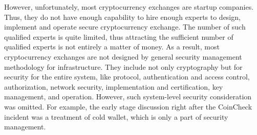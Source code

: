 However, unfortunately, most cryptocurrency exchanges are startup companies. Thus, they do not have enough
capability to hire enough experts to design, implement and operate secure cryptocurrency exchange. The number of
such qualified experts is quite limited, thus attracting the sufficient number of qualified experts is not entirely a matter of money.
As a result, most cryptocurrency exchanges are not designed by general security management methodology for infrastructure.
They include not only cryptography but for security for the entire system, like protocol, authentication and access control, authorization,
network security, implementation and certification, key management, and operation.
However, such system-level security consideration was omitted.
For example, the early stage discussion right after the CoinCheck incident was a treatment of cold wallet, which is only a part of security management.

%

